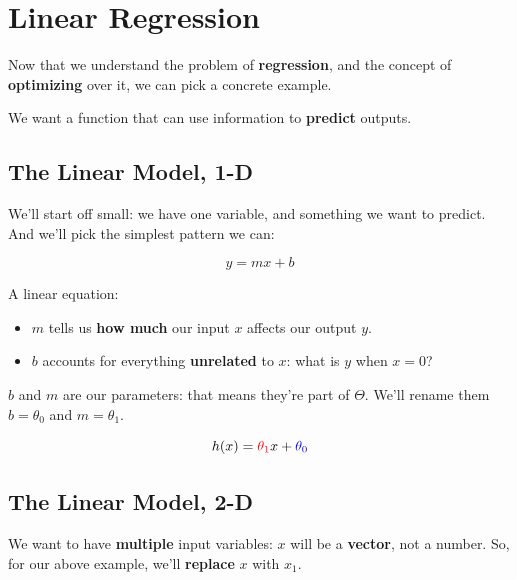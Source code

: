 \pagebreak

\section{Linear Regression}

    Now that we understand the problem of \textbf{regression}, and the concept of \textbf{optimizing} over it, we can pick a concrete example.
    
    We want a function that can use information to \textbf{predict} outputs.
    
    \subsection{The Linear Model, 1-D}
    
        We'll start off small: we have one variable, and something we want to predict. And we'll pick the simplest pattern we can:

        \begin{equation}
            y = mx+b
        \end{equation}
        
        A linear equation: 
        
        \begin{itemize}
            \item $m$ tells us \textbf{how much} our input $x$ affects our output $y$.
            \item $b$ accounts for everything \textbf{unrelated} to $x$: what is $y$ when $x=0$?
        \end{itemize}

        $b$ and $m$ are our parameters: that means they're part of $\Theta$. We'll rename them $b=\theta_0$ and $m=\theta_1$.
        
        \begin{equation}
            h(x) = \textcolor{red}{\theta_1} x + \textcolor{blue}{\theta_0}
        \end{equation}
        
    \subsection{The Linear Model, 2-D}
    
        We want to have \textbf{multiple} input variables: $x$ will be a \textbf{vector}, not a number. So, for our above example, we'll \textbf{replace} $x$ with $x_1$.
        
